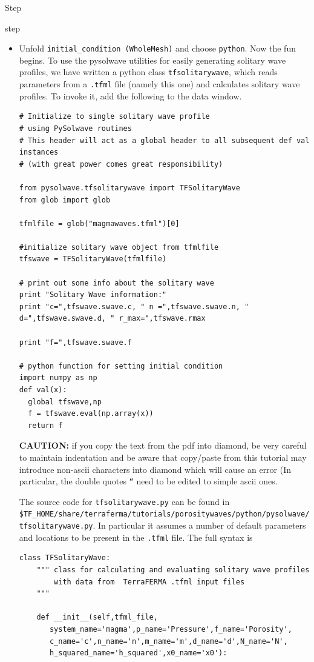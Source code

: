 \begin{steps}{Step}
\begin{steps}{step}
\begin{itemize}
    \item Unfold \texttt{initial\_condition (WholeMesh)} and choose
      \texttt{python}.  Now the fun begins. To use the pysolwave
      utilities for easily generating solitary wave profiles,  we have
      written a python class \texttt{tfsolitarywave},  which reads
      parameters from a \texttt{.tfml} file (namely this one) and
      calculates solitary wave profiles.  To invoke it, add the
      following to the data window.
      \begin{lstlisting}[style=Python]
# Initialize to single solitary wave profile 
# using PySolwave routines 
# This header will act as a global header to all subsequent def val instances
# (with great power comes great responsibility)

from pysolwave.tfsolitarywave import TFSolitaryWave
from glob import glob

tfmlfile = glob("magmawaves.tfml")[0]

#initialize solitary wave object from tfmlfile
tfswave = TFSolitaryWave(tfmlfile)

# print out some info about the solitary wave 
print "Solitary Wave information:"
print "c=",tfswave.swave.c, " n =",tfswave.swave.n, " d=",tfswave.swave.d, " r_max=",tfswave.rmax

print "f=",tfswave.swave.f

# python function for setting initial condition
import numpy as np
def val(x):
  global tfswave,np
  f = tfswave.eval(np.array(x))
  return f
\end{lstlisting}
\textbf{CAUTION:} if you copy the text from the pdf into diamond, be
very careful to maintain indentation and be aware that copy/paste 
from this tutorial may introduce non-ascii characters into diamond
which will cause an error (In particular, the double quotes
\texttt{``} need to be edited to simple ascii ones.

The source code for \texttt{tfsolitarywave.py} can be found in
\texttt{\$TF\_HOME/share/terraferma/tutorials/porositywaves/python/pysolwave/tfsolitarywave.py}. In
particular it assumes a number of default parameters and locations to
be present in the \texttt{.tfml} file.  The full syntax is
\begin{lstlisting}[style=Python]
class TFSolitaryWave:
    """ class for calculating and evaluating solitary wave profiles
        with data from  TerraFERMA .tfml input files
    """

    def __init__(self,tfml_file,
       system_name='magma',p_name='Pressure',f_name='Porosity',
       c_name='c',n_name='n',m_name='m',d_name='d',N_name='N',
       h_squared_name='h_squared',x0_name='x0'):
        

\end{lstlisting}
\end{itemize}
\end{steps}
\end{steps}
